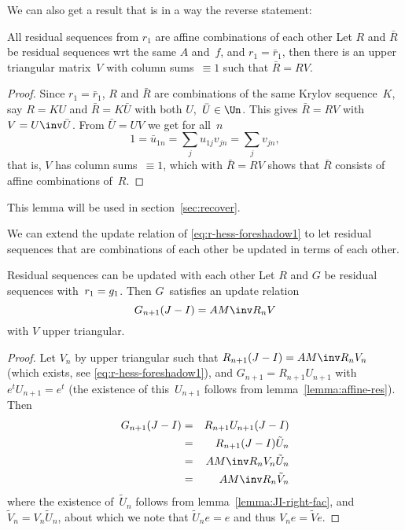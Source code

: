 We can also get a result that is in a way the reverse statement:
\begin{llemma}{All residual sequences from $r_1$
are affine combinations of each other}
\label{lemma:affine-res}
Let $R$ and $\bar R$ be residual sequences wrt the same $A$ and~$f$,
and $r_1=\bar r_1$, then
there is an upper triangular matrix~$V$ with column sums~$\equiv1$
such that $\bar R=RV$.
\end{llemma}
\begin{proof}
Since $r_1=\bar r_1$, $R$ and $\bar R$ are combinations of the same
Krylov sequence~$K$, say $R=KU$ and $\bar R=K\bar U$
with both $U$,~$\bar U\in\Un$. This gives $\bar
R=RV$ with $V=U\inv \bar U$. From $\bar U=UV$ we get for all~$n$
\[ 1=\bar u_{1n}=\sum_ju_{1j}v_{jn}=\sum_jv_{jn}, \]
that is, $V$ has column sums~$\equiv1$, which with $\bar R=RV$ shows
that $\bar R$ consists of affine combinations of~$R$.
\end{proof}

\begin{truth}
This lemma will be used in section~\ref{sec:recover}.
\end{truth}

We can extend the update relation of \eqref{eq:r-hess-foreshadow1} to let
residual sequences that are combinations of each other be updated in
terms of each other.
\begin{llemma}{Residual sequences can be updated with each other}
Let $R$ and $G$ be residual sequences with~$r_1=\nobreak g_1$.
Then $G$~satisfies an update relation
\[ G_{n+1}(J-I)=AM\inv R_nV \] with $V$ upper triangular.
\end{llemma}
\begin{proof}
Let $V_n$ by upper triangular such that $R_{n+1}(J-I)=AM\inv R_nV_n$
(which exists, see \eqref{eq:r-hess-foreshadow1}), and
$G_{n+1}=R_{n+1}U_{n+1}$ with $e^tU_{n+1}=e^t$ (the existence of
this~$U_{n+1}$ follows from lemma~\ref{lemma:affine-res}). Then
\begin{eqnarray*}
   G_{n+1}(J-I)&=&R_{n+1}U_{n+1}(J-I)\\
   &=&R_{n+1}(J-I)\tilde U_n\\
   &=&AM\inv R_nV_n\tilde U_n\\
   &=&AM\inv R_n\tilde V_n
\end{eqnarray*}
where the existence of~$\tilde U_n$ follows from
lemma~\ref{lemma:JI-right-fac}, and $\tilde V_n=V_n\tilde U_n$, about which we
note that $\tilde U_ne=e$ and thus $V_ne=\tilde Ve$.
\end{proof}

